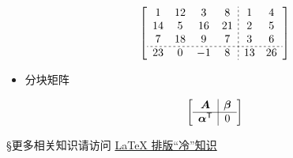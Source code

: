 \documentclass[a4paper, 12pt, UTF8]{ctexart}
\begin{document}
\begin{itemize}
    \[
        \left[
          \begin{array}{c;{2pt/2pt}c}
             \begin{matrix}
                 1 & 12 & 3 & 8 \\
                 14 & 5 & 16 &21\\
                 7 & 18 & 9 &7 \\ \hdashline[2pt/2pt]
                 23 & 0 & -1 &8\\
             \end{matrix} &
             \begin{matrix}
                 1 & 4 \\
                 2 & 5 \\
                 3 & 6 \\ \hdashline[2pt/2pt]
                 13 & 26 \\
             \end{matrix}
          \end{array}
        \right]
     \]

     \item 分块矩阵

     \[
         \begin{bmatrix}
             \begin{array}{c | c}
               \boldsymbol{A}  &  \bm{\beta}  \\  \hline
               \bm{\alpha}^{\mathsf T}   &  0
             \end{array}
         \end{bmatrix}
     \]

 \end{itemize}

\S 更多相关知识请访问 \href{https://matnoble.me/series/latex/}{\LaTeX{} 排版“冷”知识}

\clearpage
\begin{thebibliography}{99}
\end{thebibliography}

\clearpage
\end{document}

